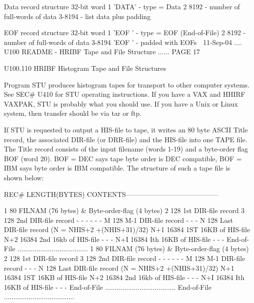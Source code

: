    Data record structure
   32-bit word  1       'DATA'  - type = Data
                2        8192   - number of full-words of data
                3-8194          - list data plus padding
 
   EOF record structure
   32-bit word  1       'EOF '  - type = EOF (End-of-File)
                2        8192   - number of full-words of data
                3-8194  'EOF '  - padded with EOFs
    
   11-Sep-04 .... U100  README - HRIBF Tape and File Structure ...... PAGE  17
 
 
   U100.110  HRIBF Histogram Tape and File Structures
 
   Program  STU  produces  histogram  tapes  for  transport  to other computer
   systems. See SEC# U410 for STU operating instructions. If you  have  a  VAX
   and  HHIRF  VAXPAK, STU is probably what you should use. If you have a Unix
   or Linux system, then transfer should be via tar or ftp.
 
   If STU is requested to output a HIS-file to tape,  it  writes  an  80  byte
   ASCII  Title record, the associated DIR-file (or DRR-file) and the HIS-file
   into one TAPE file. The Title record consists of the input filename  (words
   1-19)  and  a byte-order flag BOF (word 20). BOF = DEC says tape byte order
   is DEC compatible, BOF =  IBM  says  byte  order  is  IBM  compatible.  The
   structure of such a tape file is shown below:
 
   REC#  LENGTH(BYTES)  CONTENTS-----------------------------------------
 
      1          80     FILNAM (76 bytes) & Byte-order-flag (4 bytes)
      2         128     1st  DIR-file record
      3         128     2nd  DIR-file record
      -          -              -
      -          -              -
      M         128     M-1  DIR-file record
      -          -              -
      N         128     Last DIR-file record (N = NHIS+2 +(NHIS+31)/32)
    N+1       16384     1ST  16KB of HIS-file
    N+2       16384     2nd  16kb of HIS-file
      -          -              -
    N+I       16384     Ith  16KB of HIS-file
      -          -              -
                        End-of-File .....................................
      1          80     FILNAM (76 bytes) & Byte-order-flag (4 bytes)
      2         128     1st  DIR-file record
      3         128     2nd  DIR-file record
      -          -              -
      -          -              -
      M         128     M-1  DIR-file record
      -          -              -
      N         128     Last DIR-file record (N = NHIS+2 +(NHIS+31)/32)
    N+1       16384     1ST  16KB of HIS-file
    N+2       16384     2nd  16kb of HIS-file
      -          -              -
    N+I       16384     Ith  16KB of HIS-file
      -          -              -
                        End-of-File .....................................
                        End-of-File .....................................
 
